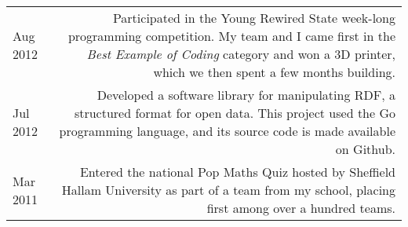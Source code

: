 \begin{longtable}{L!{\sep}R}
    Aug 2012 &
    Participated in the Young Rewired State week-long programming competition. My team and I came first in the \emph{Best Example of Coding} category and won a 3D printer, which we then spent a few months building.
    \vspace{1.2em} \\

    Jul 2012 &
    Developed a software library for manipulating RDF, a structured format for open data. This project used the Go programming language, and its source code is made available on Github.
    \vspace{1.2em} \\

    Mar 2011 &
    Entered the national Pop Maths Quiz hosted by Sheffield Hallam University as part of a team from my school, placing first among over a hundred teams.
    \\
\end{longtable}

\vspace{.2em}
